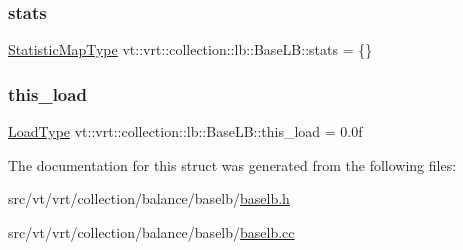 \mbox{\label{structvt_1_1vrt_1_1collection_1_1lb_1_1_base_l_b_a249359351566423733a7391dcdc2e203}} 
\subsubsection{\texorpdfstring{stats}{stats}}
{\footnotesize\ttfamily \hyperlink{structvt_1_1vrt_1_1collection_1_1lb_1_1_base_l_b_a6e8dead5546b2054f604ca258e1e815e}{Statistic\+Map\+Type} vt\+::vrt\+::collection\+::lb\+::\+Base\+L\+B\+::stats = \{\}\hspace{0.3cm}{\ttfamily [protected]}}

\mbox{\label{structvt_1_1vrt_1_1collection_1_1lb_1_1_base_l_b_ab7df874591552c346fc77858983fbbec}} 
\subsubsection{\texorpdfstring{this\+\_\+load}{this\_load}}
{\footnotesize\ttfamily \hyperlink{structvt_1_1vrt_1_1collection_1_1lb_1_1_base_l_b_a215e22b9f12678303f49615ae3be05cc}{Load\+Type} vt\+::vrt\+::collection\+::lb\+::\+Base\+L\+B\+::this\+\_\+load = 0.\+0f\hspace{0.3cm}{\ttfamily [protected]}}



The documentation for this struct was generated from the following files\+:\begin{DoxyCompactItemize}
\item 
src/vt/vrt/collection/balance/baselb/\hyperlink{baselb_8h}{baselb.\+h}\item 
src/vt/vrt/collection/balance/baselb/\hyperlink{baselb_8cc}{baselb.\+cc}\end{DoxyCompactItemize}
